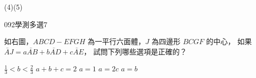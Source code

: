 \begin{QUESTIONS}
\begin{QUESTION}
\begin{QBODY}
        \end{QBODY}
        \begin{QFROMS}
        \end{QFROMS}
        \begin{QTAGS}\end{QTAGS}
        \begin{QANS}
            (4)(5)
        \end{QANS}
        \begin{QSOLLIST}
        \end{QSOLLIST}
        \begin{QEMPTYSPACE}
        \end{QEMPTYSPACE}
    \end{QUESTION}
    \begin{QUESTION}
        \begin{ExamInfo}{092}{學測}{多選}{7}
        \end{ExamInfo}
        \begin{ExamAnsRateInfo}{45}{79}{41}{15}
        \end{ExamAnsRateInfo}
        \begin{QBODY}
            如右圖，$ABCD-EFGH$ 為一平行六面體，$J$ 為四邊形 $BCGF$ 的中心，
            如果 $\lvec{AJ} = a \lvec{AB} + b\lvec{AD}+ c\lvec{AE}$，
            試問下列哪些選項是正確的？ 
            \begin{QOPS} 
                \QOP $\frac{1}{3} < b < \frac{2}{3}$ 
                \QOP $a + b + c = 2$  
                \QOP $a=1$
                \QOP $a=2c$ 
                \QOP $a=b$
            \end{QOPS}
        

\end{QBODY}
\end{QUESTION}
\end{QUESTIONS}
